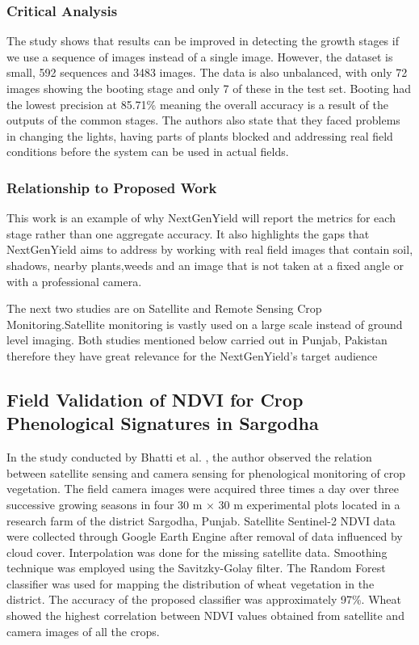 \documentclass{FastFyp}
\begin{document}
\subsubsection{Critical Analysis}
The study shows that results can be improved in detecting the growth stages if we use a sequence of images instead of a single image. However, the dataset is small, 592 sequences and 3483 images. The data is also unbalanced, with only 72 images showing the booting stage and only 7 of these in the test set. Booting had the lowest precision at 85.71\% meaning the overall accuracy is a result of the outputs of the common stages. The authors also state that they faced problems in changing the lights, having parts of plants blocked and addressing real field conditions before the system can be used in actual fields.

\subsubsection{Relationship to Proposed Work}
This work is an example of why NextGenYield will report the metrics for each stage rather than one aggregate accuracy. It also highlights the gaps that NextGenYield aims to address by working with real field images that contain soil, shadows, nearby plants,weeds and an image that is not taken at a fixed angle or with a professional camera. 


The next two studies are on Satellite and Remote Sensing Crop Monitoring.Satellite monitoring is vastly used on a large scale instead of ground level imaging. Both studies mentioned below carried out in Punjab, Pakistan therefore they have great relevance for the NextGenYield's target audience 

\subsection{Field Validation of NDVI for Crop Phenological Signatures in Sargodha}

In the study conducted by Bhatti et al. \cite{ref:Bhatti:2024} , the author observed the relation between satellite sensing and camera sensing for phenological monitoring of crop vegetation. The field camera images were acquired three times a day over three successive growing seasons in four 30 m × 30 m experimental plots located in a research farm of the district Sargodha, Punjab. Satellite Sentinel-2 NDVI data were collected through Google Earth Engine after removal of data influenced by cloud cover. Interpolation was done for the missing satellite data. Smoothing technique was employed using the Savitzky-Golay filter. The Random Forest classifier was used for mapping the distribution of wheat vegetation in the district. The accuracy of the proposed classifier was approximately 97\%. Wheat showed the highest correlation between NDVI values obtained from satellite and camera images of all the crops.
\end{document}
